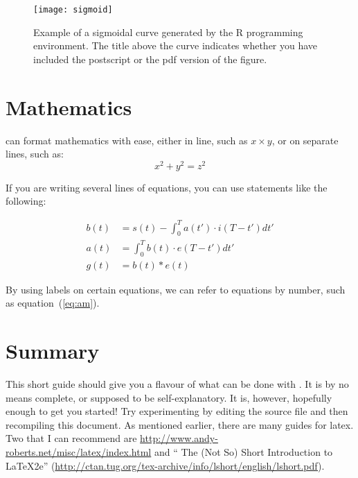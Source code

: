 \documentclass[12pt]{article}
\begin{document}
\begin{figure}
  \centering
  \texttt{[image: sigmoid]}
  \caption{Example of a sigmoidal curve generated by the R programming
    environment.  The title above the curve indicates whether you have
  included the postscript or the pdf version of the figure.}
  \label{fig:example}
\end{figure}

\section{Mathematics}

\latex can format mathematics with ease, either in line, such as 
$x \times y$, or on separate lines, such as:
\[ x^2 +y^2 = z^2 \]

If you are writing several lines of equations, you can use statements
like the following:

\begin{align}
  b(t) & = s(t) - \int_{0}^{T} a(t') \cdot i(T-t') dt'
  \\
  a(t) & = \int_{0}^{T} b(t) \cdot e(T-t') dt' \label{eq:am}
  \\
  g(t) & = b(t) \ast e(t) \nonumber
\end{align}

By using labels on certain equations, we can refer to equations by
number, such as equation~(\ref{eq:am}).

\section{Summary}
\label{sec:summary}
This short guide should give you a flavour of what can be done with
\latex.  It is by no means complete, or supposed to be
self-explanatory.  It is, however, hopefully enough to get you
started!  Try experimenting by editing the source file and then
recompiling this document.  As mentioned earlier, there are many
guides for latex.  Two that I can recommend are
\url{http://www.andy-roberts.net/misc/latex/index.html} and 
`` The (Not So) Short Introduction to LaTeX2e''
(\url{http://ctan.tug.org/tex-archive/info/lshort/english/lshort.pdf}).





\end{document}
